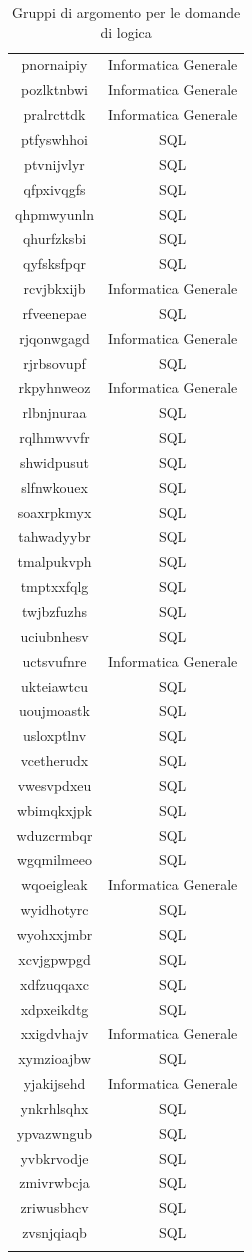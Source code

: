 \begin{longtable}{|c|c|}
pnornaipiy & Informatica Generale \\
pozlktnbwi & Informatica Generale \\
pralrcttdk & Informatica Generale \\
ptfyswhhoi & SQL \\
ptvnijvlyr & SQL \\
qfpxivqgfs & SQL \\
qhpmwyunln & SQL \\
qhurfzksbi & SQL \\
qyfsksfpqr & SQL \\
rcvjbkxijb & Informatica Generale \\
rfveenepae & SQL \\
rjqonwgagd & Informatica Generale \\
rjrbsovupf & SQL \\
rkpyhnweoz & Informatica Generale \\
rlbnjnuraa & SQL \\
rqlhmwvvfr & SQL \\
shwidpusut & SQL \\
slfnwkouex & SQL \\
soaxrpkmyx & SQL \\
tahwadyybr & SQL \\
tmalpukvph & SQL \\
tmptxxfqlg & SQL \\
twjbzfuzhs & SQL \\
uciubnhesv & SQL \\
uctsvufnre & Informatica Generale \\
ukteiawtcu & SQL \\
uoujmoastk & SQL \\
usloxptlnv & SQL \\
vcetherudx & SQL \\
vwesvpdxeu & SQL \\
wbimqkxjpk & SQL \\
wduzcrmbqr & SQL \\
wgqmilmeeo & SQL \\
wqoeigleak & Informatica Generale \\
wyidhotyrc & SQL \\
wyohxxjmbr & SQL \\
xcvjgpwpgd & SQL \\
xdfzuqqaxc & SQL \\
xdpxeikdtg & SQL \\
xxigdvhajv & Informatica Generale \\
xymzioajbw & SQL \\
yjakijsehd & Informatica Generale \\
ynkrhlsqhx & SQL \\
ypvazwngub & SQL \\
yvbkrvodje & SQL \\
zmivrwbcja & SQL \\
zriwusbhcv & SQL \\
zvsnjqiaqb & SQL \\
\hline
	
\caption{Gruppi di argomento per le domande di logica}\label{tab:Gruppi di argomento per le domande SQL}
\end{longtable}
\noindent
